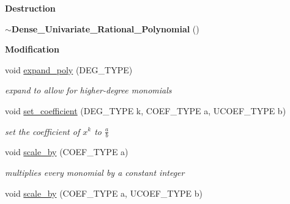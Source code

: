 \begin{Indent}\textbf{ Destruction}\par
\begin{DoxyCompactItemize}
\item 
\mbox{\label{class_dense___univariate___rational___polynomial_aeade1e7c67dd64b79340aff7555e0354}} 
{\bfseries $\sim$\+Dense\+\_\+\+Univariate\+\_\+\+Rational\+\_\+\+Polynomial} ()
\end{DoxyCompactItemize}
\end{Indent}
\begin{Indent}\textbf{ Modification}\par
\begin{DoxyCompactItemize}
\item 
void \hyperlink{class_dense___univariate___rational___polynomial_a57f7bbe1cd7ae1c2ca66d12f988a9c6d}{expand\+\_\+poly} (D\+E\+G\+\_\+\+T\+Y\+PE)
\begin{DoxyCompactList}\small\item\em expand to allow for higher-\/degree monomials \end{DoxyCompactList}\item 
\mbox{\label{class_dense___univariate___rational___polynomial_a382347b9ae8adcc72c7787b0a737fbbf}} 
void \hyperlink{class_dense___univariate___rational___polynomial_a382347b9ae8adcc72c7787b0a737fbbf}{set\+\_\+coefficient} (D\+E\+G\+\_\+\+T\+Y\+PE k, C\+O\+E\+F\+\_\+\+T\+Y\+PE a, U\+C\+O\+E\+F\+\_\+\+T\+Y\+PE b)
\begin{DoxyCompactList}\small\item\em set the coefficient of $x^k$ to $\frac{a}{b}$ \end{DoxyCompactList}\item 
\mbox{\label{class_dense___univariate___rational___polynomial_accb38470c561da8878937486c9c3c4e7}} 
void \hyperlink{class_dense___univariate___rational___polynomial_accb38470c561da8878937486c9c3c4e7}{scale\+\_\+by} (C\+O\+E\+F\+\_\+\+T\+Y\+PE a)
\begin{DoxyCompactList}\small\item\em multiplies every monomial by a constant integer \end{DoxyCompactList}\item 
void \hyperlink{class_dense___univariate___rational___polynomial_a75113519785d8fba7d957b630bd26a54}{scale\+\_\+by} (C\+O\+E\+F\+\_\+\+T\+Y\+PE a, U\+C\+O\+E\+F\+\_\+\+T\+Y\+PE b)

\end{DoxyCompactItemize}
\end{Indent}
